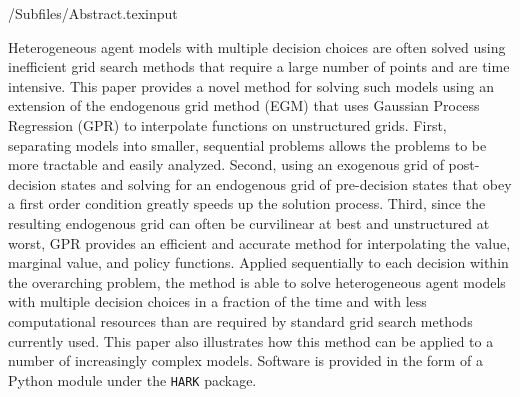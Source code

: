 \documentclass[EGMN]{subfiles}
\begin{document}
\hypertarget{abstract}{}
\begin{verbatimwrite}{\econtexRoot/Subfiles/Abstract.texinput}


  Heterogeneous agent models with multiple decision choices are often solved using inefficient grid search methods that require a large number of points and are time intensive.
  This paper provides a novel method for solving such models using an extension of the endogenous grid method (EGM) that uses Gaussian Process Regression (GPR) to interpolate functions on unstructured grids.
  First, separating models into smaller, sequential problems allows the problems to be more tractable and easily analyzed.
  Second, using an exogenous grid of post-decision states and solving for an endogenous grid of pre-decision states that obey a first order condition greatly speeds up the solution process.
  Third, since the resulting endogenous grid can often be curvilinear at best and unstructured at worst, GPR provides an efficient and accurate method for interpolating the value, marginal value, and policy functions.
  Applied sequentially to each decision within the overarching problem, the method is able to solve heterogeneous agent models with multiple decision choices in a fraction of the time and with less computational resources than are required by standard grid search methods currently used.
  This paper also illustrates how this method can be applied to a number of increasingly complex models. Software is provided in the form of a Python module under the \texttt{HARK} package.

\end{verbatimwrite}


\hypertarget{links}{}
\end{document}

